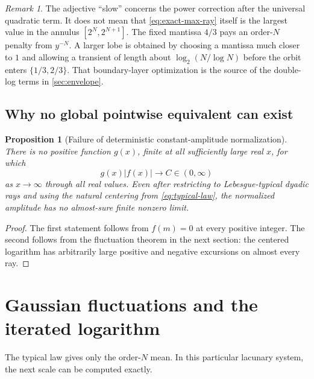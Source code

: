 \documentclass[11pt,oneside]{article}
\newtheorem{proposition}[theorem]{Proposition}
\theoremstyle{definition}
\theoremstyle{remark}
\newtheorem{remark}[theorem]{Remark}
\begin{document}
\begin{remark}
The adjective ``slow'' concerns the power correction after the universal
quadratic term.  It does not mean that \eqref{eq:exact-max-ray} itself is the
largest value in the annulus $[2^N,2^{N+1}]$.  The fixed mantissa $4/3$ pays an
order-$N$ penalty from $y^{-N}$.  A larger lobe is obtained by choosing a
mantissa much closer to $1$ and allowing a transient of length about
$\log_2(N/\log N)$ before the orbit enters $\{1/3,2/3\}$.  That boundary-layer
optimization is the source of the double-log terms in \cref{sec:envelope}.
\end{remark}

\subsection{Why no global pointwise equivalent can exist}

\begin{proposition}[Failure of deterministic constant-amplitude normalization]
There is no positive function $g(x)$, finite at all sufficiently large real
$x$, for which
\begin{equation}
 g(x)|f(x)|\longrightarrow C\in(0,\infty)                  \label{eq:no-global-normalizer}
\end{equation}
as $x\to\infty$ through all real values.
Even after restricting to Lebesgue-typical dyadic rays and using the natural
centering from \eqref{eq:typical-law}, the normalized amplitude has no
almost-sure finite nonzero limit.
\end{proposition}

\begin{proof}
The first statement follows from $f(m)=0$ at every positive integer.  The
second follows from the fluctuation theorem in the next section: the centered
logarithm has arbitrarily large positive and negative excursions on almost
every ray.
\end{proof}

\section{Gaussian fluctuations and the iterated logarithm}
\label{sec:fluctuations}

The typical law gives only the order-$N$ mean.  In this particular lacunary
system, the next scale can be computed exactly.
\end{document}
